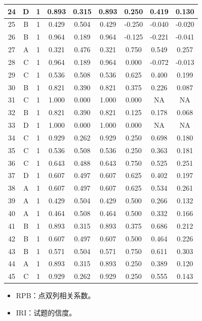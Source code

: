 \documentclass[hyperref,adobefonts]{ctexart}
\providecommand{\tightlist}{\setlength{\itemsep}{0pt}\setlength{\parskip}{0pt}}
\begin{document}
\begin{longtable}{c|c|c|c|c|c|c|c|c}
\hline
24 & D & 1 & 0.893 & 0.315 & 0.893 & 0.250 & 0.419 & 0.130\\
\hline
25 & B & 1 & 0.429 & 0.504 & 0.429 & -0.250 & -0.040 & -0.020\\
\hline
26 & B & 1 & 0.964 & 0.189 & 0.964 & -0.125 & -0.221 & -0.041\\
\hline
27 & A & 1 & 0.321 & 0.476 & 0.321 & 0.750 & 0.549 & 0.257\\
\hline
28 & C & 1 & 0.964 & 0.189 & 0.964 & 0.000 & -0.072 & -0.013\\
\hline
29 & C & 1 & 0.536 & 0.508 & 0.536 & 0.625 & 0.400 & 0.199\\
\hline
30 & B & 1 & 0.821 & 0.390 & 0.821 & 0.375 & 0.226 & 0.087\\
\hline
31 & C & 1 & 1.000 & 0.000 & 1.000 & 0.000 & NA & NA\\
\hline
32 & B & 1 & 0.821 & 0.390 & 0.821 & 0.125 & 0.178 & 0.068\\
\hline
33 & D & 1 & 1.000 & 0.000 & 1.000 & 0.000 & NA & NA\\
\hline
34 & C & 1 & 0.929 & 0.262 & 0.929 & 0.250 & 0.698 & 0.180\\
\hline
35 & C & 1 & 0.536 & 0.508 & 0.536 & 0.250 & 0.363 & 0.181\\
\hline
36 & C & 1 & 0.643 & 0.488 & 0.643 & 0.750 & 0.525 & 0.251\\
\hline
37 & D & 1 & 0.607 & 0.497 & 0.607 & 0.625 & 0.402 & 0.197\\
\hline
38 & A & 1 & 0.607 & 0.497 & 0.607 & 0.625 & 0.534 & 0.261\\
\hline
39 & A & 1 & 0.429 & 0.504 & 0.429 & 0.500 & 0.266 & 0.132\\
\hline
40 & A & 1 & 0.464 & 0.508 & 0.464 & 0.500 & 0.332 & 0.166\\
\hline
41 & B & 1 & 0.893 & 0.315 & 0.893 & 0.375 & 0.686 & 0.212\\
\hline
42 & B & 1 & 0.607 & 0.497 & 0.607 & 0.500 & 0.464 & 0.226\\
\hline
43 & B & 1 & 0.571 & 0.504 & 0.571 & 0.750 & 0.611 & 0.303\\
\hline
44 & A & 1 & 0.893 & 0.315 & 0.893 & 0.250 & 0.389 & 0.120\\
\hline
45 & C & 1 & 0.929 & 0.262 & 0.929 & 0.250 & 0.555 & 0.143\\
\hline
\end{longtable}

\begin{itemize}
\tightlist
\item
  RPB：点双列相关系数。
\item
  IRI：试题的信度。
\end{itemize}
\end{document}
